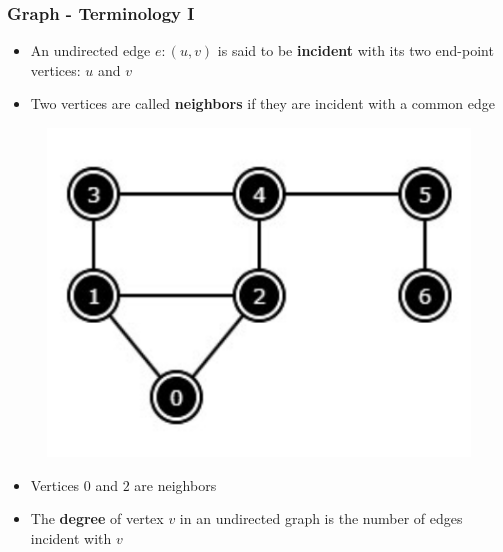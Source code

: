 \documentclass{beamer}
\begin{document}
\begin{frame}[fragile]
\frametitle{Graph - Terminology I}
	\begin{itemize}
		\item An undirected edge $e:(u,v)$ is said to be \textbf{incident} with its two end-point vertices: $u$ and $v$
		\item Two vertices are called \textbf{neighbors} if they are incident with a common edge
	\end{itemize}
	\begin{figure}
		\centering
		\includegraphics[scale=0.4]{imgs/2.4/graph/graph.png}
	\end{figure}
	\begin{itemize}
		\item Vertices $0$ and $2$ are neighbors
		\item The \textbf{degree} of vertex $v$ in an undirected graph is the number of edges incident with $v$
	\end{itemize}
\end{frame}
\end{document}
